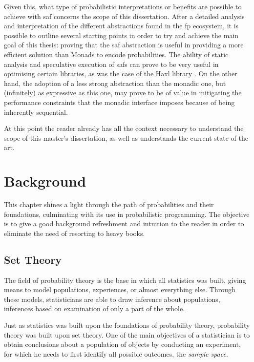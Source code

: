 \documentclass[
  oneside,
  11pt, a4paper,
  footinclude=true,
  headinclude=true,
  cleardoublepage=empty
]{scrbook}
\theoremstyle{definition}
\theoremstyle{definition}
\begin{document}
    Given this, what type of probabilistic interpretations or benefits are possible to achieve with \gls{saf} concerns the scope of this dissertation. After a detailed analysis and interpretation of the different abstractions found in the \gls{fp} ecosystem, it is possible to outline several starting points in order to try and achieve the main goal of this thesis: proving that the \gls{saf} abstraction is useful in providing a more efficient solution than Monads to encode probabilities. The ability of static analysis and speculative execution of \glspl{saf} can prove to be very useful in optimising certain libraries, as was the case of the Haxl library \citep{Marlow:2014:NFA:2692915.2628144, andrey2019selective}. On the other hand, the adoption of a less strong abstraction than the monadic one, but (infinitely) as expressive as this one, may prove to be of value in mitigating the performance constraints that the monadic interface imposes because of being inherently sequential.
    
    At this point the reader already has all the context necessary to understand the scope of this master's dissertation, as well as understands the current state-of-the art.
    
    \chapter{Background}\label{ch-background}
    
        This chapter shines a light through the path of probabilities and their foundations, culminating with its use in probabilistic programming. The objective is to give a good background refreshment and intuition to the reader in order to eliminate the need of resorting to heavy books.
        
        \section{Set Theory}
        
            The field of probability theory is the base in which all statistics was built, giving means to model populations, experiences, or almost everything else. Through these models, statisticians are able to draw inference about populations, inferences based on examination of only a part of the whole.
            
            Just as statistics was built upon the foundations of probability theory, probability theory was built upon set theory. One of the main objectives of a statistician is to obtain conclusions about a population of objects by conducting an experiment, for which he needs to first identify all possible outcomes, the \emph{sample space}.
            
\end{document}
